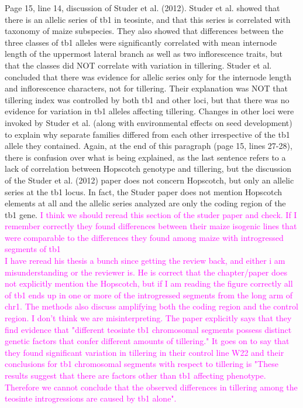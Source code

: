 \documentclass[11pt]{article}
\newcommand{\lev}[1]{\noindent \textcolor{magenta}{{#1}} \\}
\begin{document}
Page 15, line 14, discussion of Studer et al. (2012).  Studer et al. showed that there is an allelic series of tb1 in teosinte, and that this series is correlated with taxonomy of maize subspecies.  They also showed that differences between the three classes of tb1 alleles were significantly correlated with mean internode length of the uppermost lateral branch as well as two inflorescence traits, but that the classes did NOT correlate with variation in tillering.  Studer et al. concluded that there was evidence for allelic series only for the internode length and inflorescence characters, not for tillering.  Their explanation was NOT that tillering index was controlled by both tb1 and other loci, but that there was no evidence for variation in tb1 alleles affecting tillering.  Changes in other loci were invoked by Studer et al. (along with environmental effects on seed development) to explain why separate families differed from each other irrespective of the tb1 allele they
contained.  Again, at the end of this paragraph (page 15, lines 27-28), there is confusion over what is being explained, as the last sentence refers to a lack of correlation between Hopscotch genotype and tillering, but the discussion of the Studer et al. (2012) paper does not concern Hopscotch, but only an allelic series at the tb1 locus.  In fact, the Studer paper does not mention Hopscotch elements at all and the allelic series analyzed are only the coding region of the tb1 gene.
\lev{I think we should reread this section of the studer paper and check. If I remember correctly they found differences between their maize isogenic lines that were comparable to the differences they found among maize with introgressed segments of tb1}
\lev{I have reread his thesis a bunch since getting the review back, and either i am misunderstanding or the reviewer is. He is correct that the chapter/paper does not explicitly mention the Hopscotch, but if I am reading the figure correctly all of tb1 ends up in one or more of the introgressed segments from the long arm of chr1. The methods also discuss amplifying both the coding region and the control region. I don't think we are misinterpreting. The paper explicitly says that they find evidence that "different teosinte tb1 chromosomal segments possess distinct genetic factors that confer different amounts of tillering." It goes on to say that they found significant variation in tillering in their control line W22 and their conclusions for tb1 chromosomal segments with respect to tillering is "These results suggest that there are factors other than tb1 affecting phenotype. Therefore we cannot conclude that the observed differences in tillering among the teosinte introgressions are caused by tb1 alone".}
\end{document}
